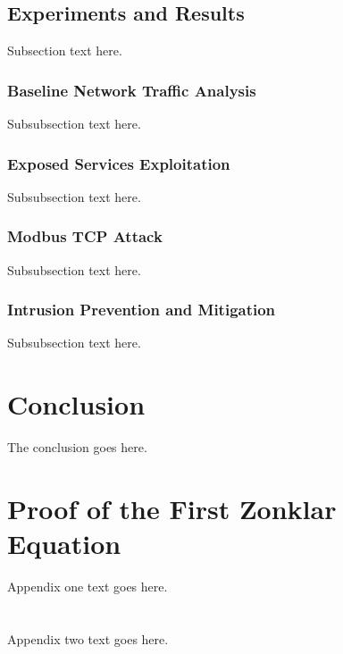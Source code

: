 \documentclass[journal]{IEEEtran}
\begin{document}
\subsection{Experiments and Results}
Subsection text here.


\subsubsection{Baseline Network Traffic Analysis}
Subsubsection text here.

\subsubsection{Exposed Services Exploitation}
Subsubsection text here.

\subsubsection{Modbus TCP Attack}
Subsubsection text here.

\subsubsection{Intrusion Prevention and Mitigation}
Subsubsection text here.

\section{Conclusion}
The conclusion goes here.








\appendices
\section{Proof of the First Zonklar Equation}
Appendix one text goes here.

\section{}
Appendix two text goes here.
\end{document}

